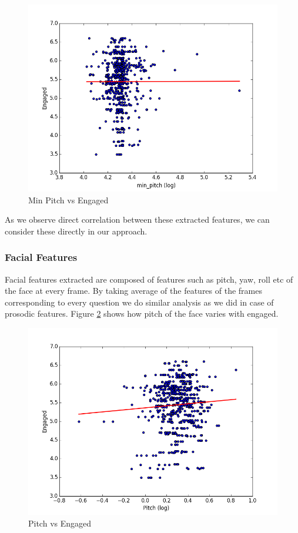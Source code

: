 \documentclass[11pt]{article}
\begin{document}
\begin{figure}[h!]
\begin{center}
\includegraphics[width=0.7\columnwidth]{figures/Engaged and min_pitch.png}
\caption{Min Pitch vs Engaged}
\label{fig:prosodic_analysis4}
\end{center}
\end{figure}

As we observe direct correlation between these extracted features, we can consider these directly in our approach.

\subsubsection{Facial Features}
Facial features extracted are composed of features such as pitch, yaw, roll etc of the face at every frame. By taking average of the features of the frames corresponding to every question we do similar analysis as we did in case of prosodic features. Figure \ref{fig:facial_analysis} shows how pitch of the face varies with engaged.

\begin{figure}[h!]
\begin{center}
\includegraphics[width=0.7\columnwidth]{figures/Engaged and Pitch.png}
\caption{Pitch vs Engaged}
\label{fig:facial_analysis}
\end{center}
\end{figure}
\end{document}
